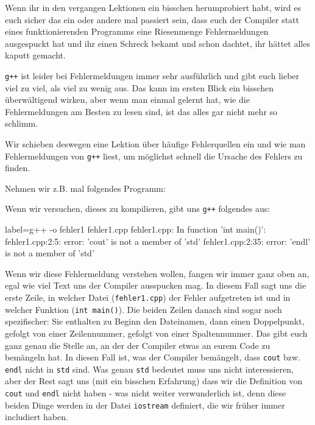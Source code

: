 
Wenn ihr in den vergangen Lektionen ein bisschen herumprobiert habt, wird es
euch sicher das ein oder andere mal passiert sein, dass euch der Compiler statt
eines funktionierenden Programms eine Riesenmenge Fehlermeldungen ausgespuckt
hat und ihr einen Schreck bekamt und schon dachtet, ihr hättet alles kaputt
gemacht.

\texttt{g++} ist leider bei Fehlermeldungen immer sehr ausführlich und gibt
euch lieber viel zu viel, als viel zu wenig aus. Das kann im ersten Blick ein
bisschen überwältigend wirken, aber wenn man einmal gelernt hat, wie die
Fehlermeldungen am Besten zu lesen sind, ist das alles gar nicht mehr so
schlimm.

Wir schieben deswegen eine Lektion über häufige Fehlerquellen ein und wie man
Fehlermeldungen von \texttt{g++} liest, um möglichst schnell die Ursache des
Fehlers zu finden.

Nehmen wir z.B. mal folgendes Programm:


Wenn wir versuchen, dieses zu kompilieren, gibt uns \texttt{g++} folgendes aus:

\begin{textcode*}{label=g++ -o fehler1 fehler1.cpp}
    fehler1.cpp: In function 'int main()':
    fehler1.cpp:2:5: error: 'cout' is not a member of 'std'
    fehler1.cpp:2:35: error: 'endl' is not a member of 'std'
\end{textcode*}

Wenn wir diese Fehlermeldung verstehen wollen, fangen wir immer ganz oben an,
egal wie viel Text uns der Compiler ausspucken mag. In diesem Fall sagt uns die
erste Zeile, in welcher Datei (\texttt{fehler1.cpp}) der Fehler aufgetreten ist
und in welcher Funktion (\texttt{int main()}). Die beiden Zeilen
danach sind sogar noch spezifischer: Sie enthalten zu Beginn den Dateinamen,
dann einen Doppelpunkt, gefolgt von einer Zeilennummer, gefolgt von einer
Spaltennummer. Das gibt euch ganz genau die Stelle an, an der der Compiler
etwas an eurem Code zu bemängeln hat. In diesen Fall ist, was der Compiler
bemängelt, dass \texttt{cout} bzw. \texttt{endl} nicht in \texttt{std} sind.
Was genau \texttt{std} bedeutet muss uns nicht interessieren, aber der Rest
sagt uns (mit ein bisschen Erfahrung) dass wir die Definition von \texttt{cout}
und \texttt{endl} nicht haben - was nicht weiter verwunderlich ist, denn diese
beiden Dinge werden in der Datei \texttt{iostream} definiert, die wir früher
immer includiert haben.

